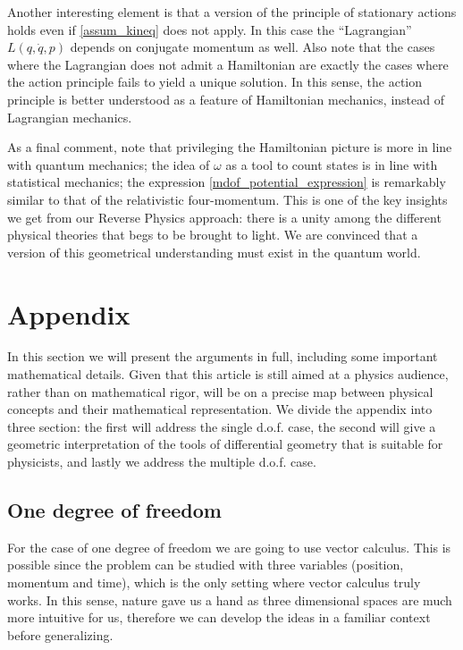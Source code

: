 \documentclass[10pt,twocolumn, nofootinbib]{revtex4-2}
\begin{document}
Another interesting element is that a version of the principle of stationary actions holds even if \ref{assum_kineq} does not apply. In this case the ``Lagrangian'' $L(q,\dot{q},p)$ depends on conjugate momentum as well. Also note that the cases where the Lagrangian does not admit a Hamiltonian are exactly the cases where the action principle fails to yield a unique solution. In this sense, the action principle is better understood as a feature of Hamiltonian mechanics, instead of Lagrangian mechanics.

As a final comment, note that privileging the Hamiltonian picture is more in line with quantum mechanics; the idea of $\omega$ as a tool to count states is in line with statistical mechanics; the expression \ref{mdof_potential_expression} is remarkably similar to that of the relativistic four-momentum. This is one of the key insights we get from our Reverse Physics approach: there is a unity among the different physical theories that begs to be brought to light. We are convinced that a version of this geometrical understanding must exist in the quantum world.




\section*{Appendix}

In this section we will present the arguments in full, including some important mathematical details. Given that this article is still aimed at a physics audience, rather than on mathematical rigor, will be on a precise map between physical concepts and their mathematical representation. We divide the appendix into three section: the first will address the single d.o.f. case, the second will give a geometric interpretation of the tools of differential geometry that is suitable for physicists, and lastly we address the multiple d.o.f. case.

\subsection*{One degree of freedom}

For the case of one degree of freedom we are going to use vector calculus. This is possible since the problem can be studied with three variables (position, momentum and time), which is the only setting where vector calculus truly works. In this sense, nature gave us a hand as three dimensional spaces are much more intuitive for us, therefore we can develop the ideas in a familiar context before generalizing.
\end{document}
